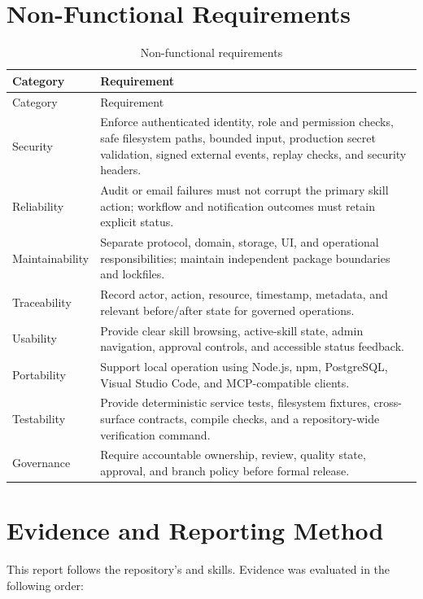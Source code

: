 \documentclass[12pt]{report}
\begin{document}
\section{Non-Functional Requirements}

\begin{longtable}{p{}p{}}
\caption{Non-functional requirements}\label{tab:nfrs}\\
\toprule
Category & Requirement \\
\midrule
\endfirsthead
\toprule
Category & Requirement \\
\midrule
\endhead
Security & Enforce authenticated identity, role and permission checks, safe filesystem paths, bounded input, production secret validation, signed external events, replay checks, and security headers. \\
Reliability & Audit or email failures must not corrupt the primary skill action; workflow and notification outcomes must retain explicit status. \\
Maintainability & Separate protocol, domain, storage, UI, and operational responsibilities; maintain independent package boundaries and lockfiles. \\
Traceability & Record actor, action, resource, timestamp, metadata, and relevant before/after state for governed operations. \\
Usability & Provide clear skill browsing, active-skill state, admin navigation, approval controls, and accessible status feedback. \\
Portability & Support local operation using Node.js, npm, PostgreSQL, Visual Studio Code, and MCP-compatible clients. \\
Testability & Provide deterministic service tests, filesystem fixtures, cross-surface contracts, compile checks, and a repository-wide verification command. \\
Governance & Require accountable ownership, review, quality state, approval, and branch policy before formal release. \\
\bottomrule
\end{longtable}

\section{Evidence and Reporting Method}

This report follows the repository's  and  skills. Evidence was evaluated in the following order:
\end{document}
